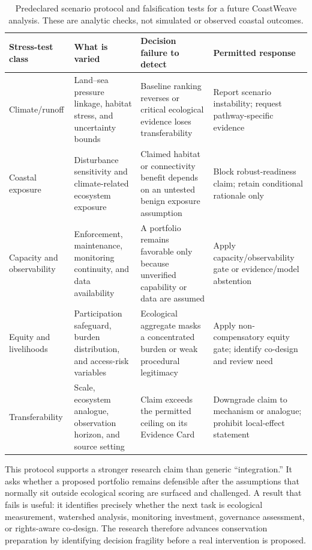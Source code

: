 \documentclass[conference]{IEEEtran}
\begin{document}
\begin{table}[t]
\caption{Predeclared scenario protocol and falsification tests for a future CoastWeave analysis. These are analytic checks, not simulated or observed coastal outcomes.}
\label{tab:scenario}
\centering
\footnotesize
\renewcommand{\arraystretch}{1.14}
\begin{tabular}{|p{}|p{}|p{}|p{}|}
\hline
\textbf{Stress-test class} & \textbf{What is varied} & \textbf{Decision failure to detect} & \textbf{Permitted response} \\
\hline
Climate/runoff & Land--sea pressure linkage, habitat stress, and uncertainty bounds & Baseline ranking reverses or critical ecological evidence loses transferability & Report scenario instability; request pathway-specific evidence \\
\hline
Coastal exposure & Disturbance sensitivity and climate-related ecosystem exposure & Claimed habitat or connectivity benefit depends on an untested benign exposure assumption & Block robust-readiness claim; retain conditional rationale only \\
\hline
Capacity and observability & Enforcement, maintenance, monitoring continuity, and data availability & A portfolio remains favorable only because unverified capability or data are assumed & Apply capacity/observability gate or evidence/model abstention \\
\hline
Equity and livelihoods & Participation safeguard, burden distribution, and access-risk variables & Ecological aggregate masks a concentrated burden or weak procedural legitimacy & Apply non-compensatory equity gate; identify co-design and review need \\
\hline
Transferability & Scale, ecosystem analogue, observation horizon, and source setting & Claim exceeds the permitted ceiling on its Evidence Card & Downgrade claim to mechanism or analogue; prohibit local-effect statement \\
\hline
\end{tabular}
\end{table}

This protocol supports a stronger research claim than generic ``integration.'' It asks whether a proposed portfolio remains defensible after the assumptions that normally sit outside ecological scoring are surfaced and challenged. A result that fails is useful: it identifies precisely whether the next task is ecological measurement, watershed analysis, monitoring investment, governance assessment, or rights-aware co-design. The research therefore advances conservation preparation by identifying decision fragility before a real intervention is proposed.
\end{document}
